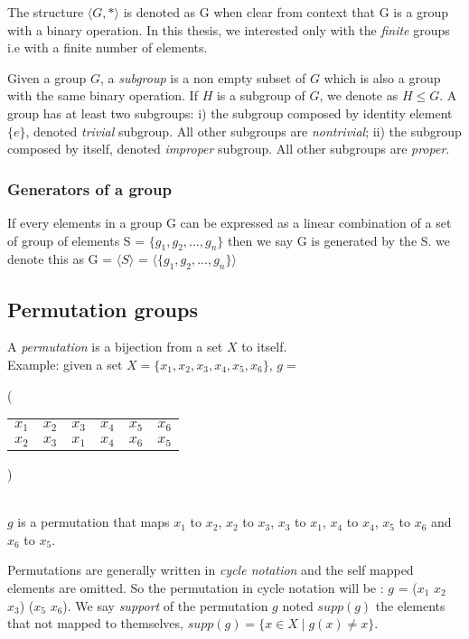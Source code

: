 The structure $\langle G, * \rangle$ is denoted as G when clear from context that G is a group
with a binary operation. In this thesis, we interested only with the \emph{finite} groups i.e
with a finite number of elements.

Given a group $G$, a \emph{subgroup} is a non empty subset of $G$ which is also a group with 
the same binary operation. If $H$ is a subgroup of $G$, we denote as $H \leq G$.
A group has at least two subgroups: i) the subgroup composed by identity element $\{e\}$, denoted \emph{trivial} subgroup. All other subgroups are \emph{nontrivial}; ii) the subgroup composed by itself, denoted \emph{improper} subgroup. All other subgroups are \emph{proper}.


\subsubsection{Generators of a group}

If every elements in a group G can be expressed as a linear combination
of a set of group of elements S = $\{g_1, g_2, ..., g_n \}$ then we say G is 
generated by the S. we denote this as G = $\langle S \rangle$ =
$\langle \{g_1, g_2, ..., g_n \} \rangle$ 



\subsection{Permutation groups}
 
A \emph{permutation} is a bijection from a set $X$ to itself.\\
 Example: given a set $X = \{x_1, x_2, x_3, x_4, x_5, x_6\}$,
$g = ${\Bigg( \begin{tabular}{cccccc}
		$x_1$ & $x_2$ & $x_3$ & $x_4$ & $x_5$ & $x_6$\\
		$x_2$ & $x_3$ & $x_1$ & $x_4$ & $x_6$ & $x_5$
	\end{tabular} \Bigg)}\\
$g$ is a permutation that maps $x_1$ to $x_2$, $x_2$ to $x_3$, $x_3$ to $x_1$, $x_4$ to $x_4$, $x_5$ to $x_6$ and $x_6$ to $x_5$.

Permutations are generally written in \emph{cycle notation} and the self mapped elements are omitted.
So the permutation in cycle notation will be : $g$ = ($x_1$ $x_2$ $x_3$) ($x_5$ $x_6$).
We say \emph{support} of the permutation $g$ noted $supp(g)$ the elements that not mapped to themselves,
$supp(g) = \{ x \in X \mid g(x) \neq x\}$.


